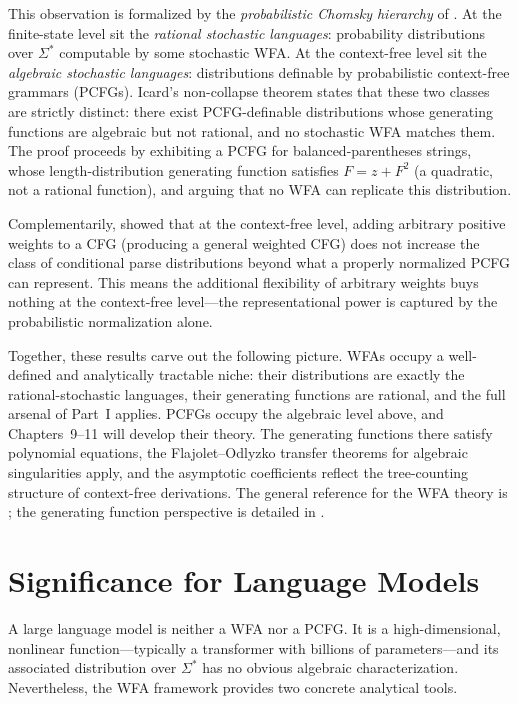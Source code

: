 This observation is formalized by the \emph{probabilistic Chomsky hierarchy} of \cite{Icard2020}. At the finite-state level sit the \emph{rational stochastic languages}: probability distributions over $\Sigma^*$ computable by some stochastic WFA. At the context-free level sit the \emph{algebraic stochastic languages}: distributions definable by probabilistic context-free grammars (PCFGs). Icard's non-collapse theorem states that these two classes are strictly distinct: there exist PCFG-definable distributions whose generating functions are algebraic but not rational, and no stochastic WFA matches them. The proof proceeds by exhibiting a PCFG for balanced-parentheses strings, whose length-distribution generating function satisfies $F = z + F^2$ (a quadratic, not a rational function), and arguing that no WFA can replicate this distribution.

Complementarily, \cite{SmithJohnson2007} showed that at the context-free level, adding arbitrary positive weights to a CFG (producing a general weighted CFG) does not increase the class of conditional parse distributions beyond what a properly normalized PCFG can represent. This means the additional flexibility of arbitrary weights buys nothing at the context-free level---the representational power is captured by the probabilistic normalization alone.

Together, these results carve out the following picture. WFAs occupy a well-defined and analytically tractable niche: their distributions are exactly the rational-stochastic languages, their generating functions are rational, and the full arsenal of Part~I applies. PCFGs occupy the algebraic level above, and Chapters~9--11 will develop their theory. The generating functions there satisfy polynomial equations, the Flajolet--Odlyzko transfer theorems for algebraic singularities apply, and the asymptotic coefficients reflect the tree-counting structure of context-free derivations. The general reference for the WFA theory is \cite{DrosteKuichVogler2009}; the generating function perspective is detailed in \cite{FlajoletSedgewick2009}.

\section{Significance for Language Models}

A large language model is neither a WFA nor a PCFG. It is a high-dimensional, nonlinear function---typically a transformer with billions of parameters---and its associated distribution over $\Sigma^*$ has no obvious algebraic characterization. Nevertheless, the WFA framework provides two concrete analytical tools.

